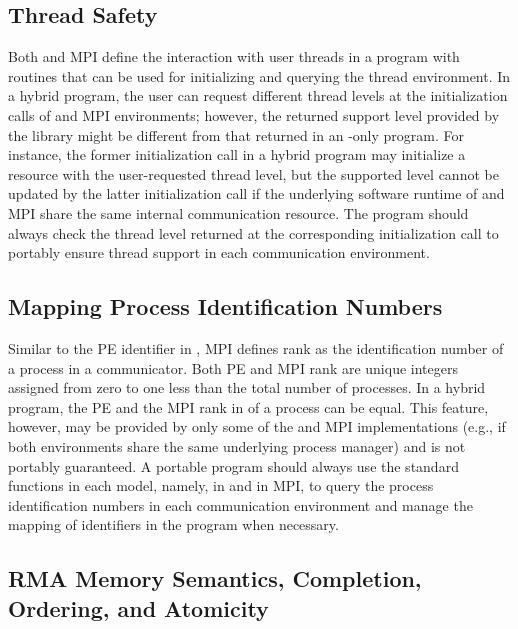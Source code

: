\subsection{Thread Safety}
\label{subsec:interoperability:thread}
Both \openshmem and MPI define the interaction with user threads in a program
with routines that can be used for initializing and querying the thread
environment. In a hybrid program, the user can request different thread levels
at the initialization calls of \openshmem and MPI environments; however, the
returned support level provided by the \openshmem library might be different
from that returned in an \openshmem-only program. For instance, the former
initialization call in a hybrid program may initialize a resource with the
user-requested thread level, but the supported level cannot be updated by the latter
initialization call if the underlying software runtime of \openshmem and MPI
share the same internal communication resource.
The program should always check the  thread level returned
at the corresponding initialization call to portably ensure thread support in each
communication environment.


\subsection{Mapping Process Identification Numbers}
\label{subsec:interoperability:id}

Similar to the PE identifier in \openshmem, MPI defines rank as the
identification number of a process in a communicator. Both \openshmem PE
and MPI rank are unique integers assigned from zero to one less than the total
number of processes. In a hybrid program, the \openshmem
PE and the MPI rank in  of a process can be equal.
This feature, however, may be provided by only some of the \openshmem and MPI
implementations (e.g., if both environments share the same underlying process
manager) and is not portably guaranteed. A portable program should always
use the standard functions in each model, namely,  in \openshmem
and  in MPI, to query the process identification numbers
in each communication environment and manage the mapping of identifiers in the
program when necessary.


\subsection{RMA Memory Semantics, Completion, Ordering, and Atomicity}
\label{subsec:interoperability:rma}

